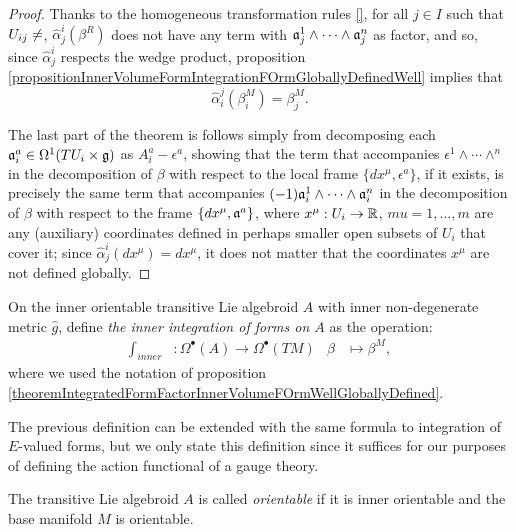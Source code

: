 \begin{proof}
Thanks to the homogeneous transformation rules \ref{}, for all $j \in I$ such that $U_{ij} \neq \empty$, $\hat \alpha^i_j(\beta^R)$ does not have any term with $\mathfrak{a}_j^1 \wedge \cdots \wedge \mathfrak{a}_j^n$ as factor, and so, since $\hat \alpha^i_j$ respects the wedge product, proposition \ref{propositionInnerVolumeFormIntegrationFOrmGloballyDefinedWell} implies that
\begin{equation}
    \hat \alpha^j_i(\beta^{M}_i) = \beta^{M}_j.
\end{equation}

The last part of the theorem is follows simply from decomposing each $\mathfrak{a}_i^a \in \Omega^1(TU_i \times \mathfrak{g})$ as $A_i^a - \epsilon^a$, showing that the term that accompanies $\epsilon^1 \wedge \cdots \wedge^n$ in the decomposition of $\beta$ with respect to the local frame $\{dx^\mu, \epsilon^a\}$, if it exists, is precisely the same term that accompanies $(-1)\mathfrak{a}_i^1 \wedge \cdots \wedge \mathfrak{a}_i^n$ in the decomposition of $\beta$ with respect to the frame $\{dx^\mu, \mathfrak{a}^a\}$, where $x^\mu: U_i\to \mathbb{R}$, $mu = 1, \dots , m$ are any (auxiliary) coordinates defined in perhaps smaller open subsets of $U_i$ that cover it; since $\hat \alpha^i_j(dx^\mu) = dx^\mu$, it does not matter that the coordinates $x^\mu$ are not defined globally.
\end{proof}


\begin{definition}
On the inner orientable transitive Lie algebroid $A$ with inner non-degenerate metric $\hat g$, define \emph{the inner integration of forms on $A$} as the operation:
\begin{align}
    \int_{inner} &: \Omega^\bullet(A) \to \Omega^\bullet(TM)
    & \beta &\mapsto \beta^M,
\end{align}
where we used the notation of proposition \ref{theoremIntegratedFormFactorInnerVolumeFOrmWellGloballyDefined}.
\end{definition}
The previous definition can be extended with the same formula to integration of $E$-valued forms, but we only state this definition since it suffices for our purposes of defining the action functional of a gauge theory.

\linea

\begin{definition}
The transitive Lie algebroid $A$ is called \emph{orientable} if it is inner orientable and the base manifold $M$ is orientable.
\end{definition}

